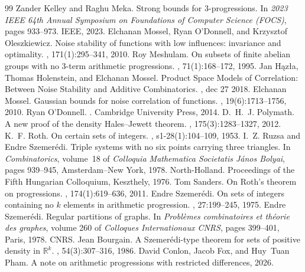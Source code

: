 \documentclass[10pt,a4paper]{amsart}
\begin{document}
\begin{thebibliography}{99}
 Zander Kelley and Raghu Meka. \newblock Strong bounds for {$3$}-progressions. \newblock In {\em 2023 {IEEE} 64th Annual Symposium on Foundations of Computer Science ({FOCS})}, pages 933--973. {IEEE}, 2023.
 Elchanan Mossel, Ryan O'Donnell, and Krzysztof Oleszkiewicz. \newblock Noise stability of functions with low influences: invariance and optimality. , 171(1):295--341, 2010.
 Roy Meshulam. \newblock On subsets of finite abelian groups with no {$3$}-term arithmetic progressions. , 71(1):168--172, 1995.
 Jan H{\k a}z\l{}a, Thomas Holenstein, and Elchanan Mossel. \newblock Product {Space} {Models} of {Correlation}: Between {Noise} {Stability} and {Additive} {Combinatorics}. , dec 27 2018.
 Elchanan Mossel. \newblock Gaussian bounds for noise correlation of functions. , 19(6):1713--1756, 2010.
 Ryan O'Donnell. . \newblock Cambridge University Press, 2014.
 D.~H.~J. Polymath. \newblock A new proof of the density {Hales--Jewett} theorem. , 175(3):1283--1327, 2012.
 K.~F. Roth. \newblock On certain sets of integers. , s1-28(1):104--109, 1953.
 I.~Z. Ruzsa and Endre Szemer{\'e}di. \newblock Triple systems with no six points carrying three triangles. \newblock In {\em Combinatorics}, volume~18 of {\em Colloquia Mathematica Societatis J{\'a}nos Bolyai}, pages 939--945, Amsterdam--New York, 1978. North-Holland. \newblock Proceedings of the Fifth Hungarian Colloquium, Keszthely, 1976.
 Tom Sanders. \newblock On {Roth}'s theorem on progressions. , 174(1):619--636, 2011.
 Endre Szemer{\'e}di. \newblock On sets of integers containing no {$k$} elements in arithmetic progression. , 27:199--245, 1975.
 Endre Szemer{\'e}di. \newblock Regular partitions of graphs. \newblock In {\em Probl{\`e}mes combinatoires et th{\'e}orie des graphes}, volume 260 of {\em Colloques Internationaux {CNRS}}, pages 399--401, Paris, 1978. {CNRS}.
 Jean Bourgain. \newblock A {Szemer{\'e}di}-type theorem for sets of positive density in {$\mathbb{R}^k$}. , 54(3):307--316, 1986.
 David Conlon, Jacob Fox, and Huy~Tuan Pham. \newblock A note on arithmetic progressions with restricted differences, 2026.
\end{thebibliography}
\end{document}
